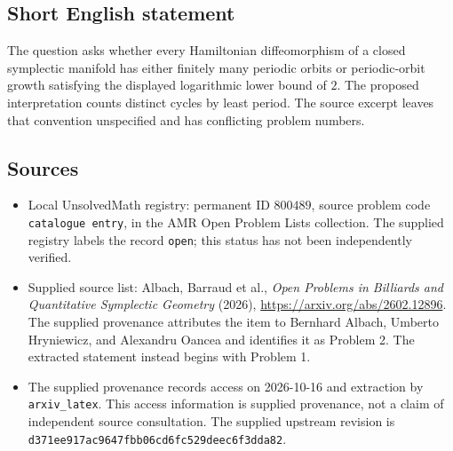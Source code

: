 \documentclass[11pt]{article}
\begin{document}
\subsection{Short English statement}
The question asks whether every Hamiltonian diffeomorphism of a closed symplectic manifold has either finitely many periodic orbits or periodic-orbit growth satisfying the displayed logarithmic lower bound of \(2\). The proposed interpretation counts distinct cycles by least period. The source excerpt leaves that convention unspecified and has conflicting problem numbers.
\subsection{Sources}
\begin{itemize}
\item Local UnsolvedMath registry: permanent ID \(800489\), source problem code \texttt{catalogue entry}, in the AMR Open Problem Lists collection. The supplied registry labels the record \texttt{open}; this status has not been independently verified.
\item Supplied source list: Albach, Barraud et al., \emph{Open Problems in Billiards and Quantitative Symplectic Geometry} (2026), \url{https://arxiv.org/abs/2602.12896}. The supplied provenance attributes the item to Bernhard Albach, Umberto Hryniewicz, and Alexandru Oancea and identifies it as Problem 2. The extracted statement instead begins with Problem 1.
\item The supplied provenance records access on 2026-10-16 and extraction by \texttt{arxiv\_latex}. This access information is supplied provenance, not a claim of independent source consultation. The supplied upstream revision is \texttt{d371ee917ac9647fbb06cd6fc529deec6f3dda82}.
\end{itemize}
\end{document}
